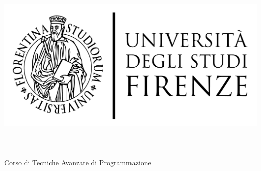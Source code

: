 \begin{titlepage}
	\begin{center}
   	\large
      \hfill
      \vfill
      \begingroup
         \includegraphics[scale=0.15]{logo/LOGO}\\
			\spacedallcaps{\myUni} \\ 
			\myFaculty \\
			\myDegree \\ 
			\vspace{0.5cm}
         \vspace{0.5cm}    
         Corso di Tecniche Avanzate di Programmazione
      \endgroup 
      \vfill 
      \begingroup
      	\color{Maroon}\spacedallcaps{\myItalianTitle} \\ $\ $\\
	\bigskip
      \endgroup
      \spacedlowsmallcaps{\myName}
      \vfill 
      \vfill
      \emph{\myProf}
      \vfill
      \vfill
      \myTime
      \vfill                      
	\end{center}        
\end{titlepage}   
